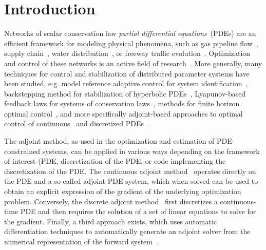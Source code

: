 \section{Introduction} %
\label{sec:introduction}

Networks of scalar conservation law \textit{partial differential 
equations}~(PDEs) are an efficient framework for modeling physical phenomena, 
such as gas pipeline flow~\cite{Rothfarb1970}, supply 
chain~\cite{Brunnermeier1999}, water distribution~\cite{Nguyen}, or freeway 
traffic evolution~\cite{garavello2006traffic,work2010traffic}. Optimization and 
control of these networks is an active field of 
research~\cite{Gugat2005,Bayen2006,Kotsialos2004}. More generally, many 
techniques for control and stabilization of distributed parameter systems have 
been studied, e.g. model reference adaptive control for system 
identification~\cite{Bohm1998}, backstepping method for stabilization of 
hyperbolic PDEs~\cite{Vazquez2011}, Lyapunov-based feedback laws for systems of 
conservation laws~\cite{Coron2007a}, methods for finite horizon optimal 
control~\cite{Fahroo2002}, and more specifically adjoint-based approaches to 
optimal control of continuous~\cite{Reuther1996} and discretized 
PDEs~\cite{Giles2000}.

The adjoint method, as used in the optimization and estimation of 
PDE-constrained systems, can be applied in various ways depending on the 
framework of interest (PDE, discretization of the PDE, or code implementing the 
discretization of the PDE. The continuous adjoint 
method~\cite{Jacquet2005,Gugat2005,Moin1994,Reuther1996} operates directly on 
the PDE and a so-called adjoint PDE system, which when solved can be used to 
obtain an explicit 
expression of the gradient of the underlying optimization problem. Conversely, 
the discrete adjoint 
method~\cite{Giles2000,Gugat2005,Kotsialos2004} first discretizes a 
continuous-time PDE and then requires the solution of a set of linear equations 
to solve for the gradient. Finally, a third approach exists, which uses 
automatic differentiation techniques to automatically generate an adjoint 
solver from the numerical representation of the forward 
system~\cite{Muller2005,Giering1998}.


